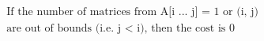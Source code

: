 \documentclass[preview]{standalone}
\begin{document}
\begin{center}
\begin{align*}
&\text{If the number of matrices from A[i ... j] = 1 or (i, j)}\\
&\text{are out of bounds (i.e. j $<$ i), then the cost is 0}
\end{align*}
\end{center}
\end{document}

